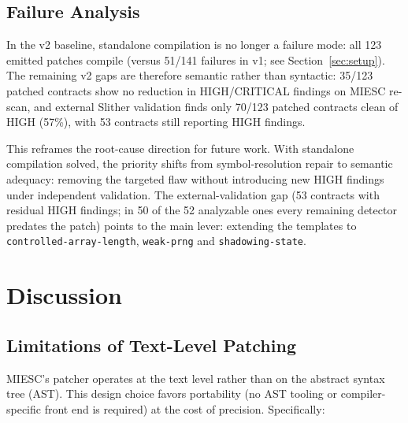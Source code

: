 \documentclass[conference]{IEEEtran}
\begin{document}
\subsection{Failure Analysis}

In the v2 baseline, standalone compilation is no longer a failure mode: all 123 emitted patches compile (versus 51/141 failures in v1; see Section~\ref{sec:setup}). The remaining v2 gaps are therefore semantic rather than syntactic: 35/123 patched contracts show no reduction in HIGH/CRITICAL findings on MIESC re-scan, and external Slither validation finds only 70/123 patched contracts clean of HIGH (57\%), with 53 contracts still reporting HIGH findings.

This reframes the root-cause direction for future work. With standalone compilation solved, the priority shifts from symbol-resolution repair to semantic adequacy: removing the targeted flaw without introducing new HIGH findings under independent validation. The external-validation gap (53 contracts with residual HIGH findings; in 50 of the 52 analyzable ones every remaining detector predates the patch) points to the main lever: extending the templates to \texttt{controlled-array-length}, \texttt{weak-prng} and \texttt{shadowing-state}.

\section{Discussion}

\subsection{Limitations of Text-Level Patching}\label{sec:textlevel}

MIESC's patcher operates at the text level rather than on the abstract syntax tree (AST). This design choice favors portability (no AST tooling or compiler-specific front end is required) at the cost of precision. Specifically:
\end{document}
